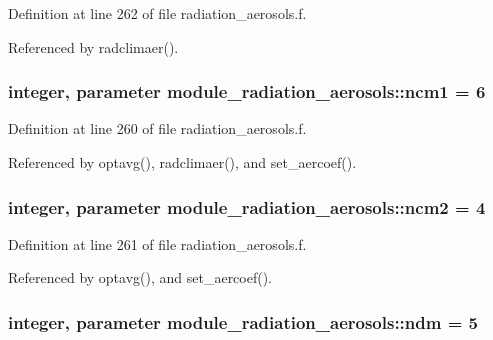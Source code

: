 Definition at line 262 of file radiation\+\_\+aerosols.\+f.



Referenced by radclimaer().

\subsubsection[{\texorpdfstring{ncm1}{ncm1}}]{\setlength{\rightskip}{0pt plus 5cm}integer, parameter module\+\_\+radiation\+\_\+aerosols\+::ncm1 = 6\hspace{0.3cm}{\ttfamily [private]}}\hypertarget{namespacemodule__radiation__aerosols_ac6bc533a79d4b19129834cbc9a9fbc18}{}\label{namespacemodule__radiation__aerosols_ac6bc533a79d4b19129834cbc9a9fbc18}


Definition at line 260 of file radiation\+\_\+aerosols.\+f.



Referenced by optavg(), radclimaer(), and set\+\_\+aercoef().

\subsubsection[{\texorpdfstring{ncm2}{ncm2}}]{\setlength{\rightskip}{0pt plus 5cm}integer, parameter module\+\_\+radiation\+\_\+aerosols\+::ncm2 = 4\hspace{0.3cm}{\ttfamily [private]}}\hypertarget{namespacemodule__radiation__aerosols_a61dbcce5b0bb02dd31d4a37983887a7b}{}\label{namespacemodule__radiation__aerosols_a61dbcce5b0bb02dd31d4a37983887a7b}


Definition at line 261 of file radiation\+\_\+aerosols.\+f.



Referenced by optavg(), and set\+\_\+aercoef().

\subsubsection[{\texorpdfstring{ndm}{ndm}}]{\setlength{\rightskip}{0pt plus 5cm}integer, parameter module\+\_\+radiation\+\_\+aerosols\+::ndm = 5\hspace{0.3cm}{\ttfamily [private]}}\hypertarget{namespacemodule__radiation__aerosols_ae77b22f76f193cef19b6e6c3ee8e0773}{}\label{namespacemodule__radiation__aerosols_ae77b22f76f193cef19b6e6c3ee8e0773}


